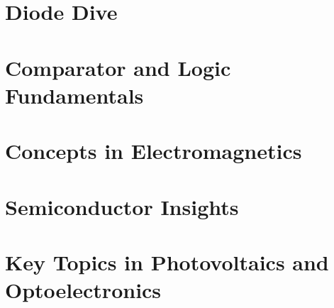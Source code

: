 \documentclass[12pt]{book}
\begin{document}
\section{Diode Dive}











\section{Comparator and Logic Fundamentals}











\section{Concepts in Electromagnetics}












\section{Semiconductor Insights}












\section{Key Topics in Photovoltaics and Optoelectronics}











\end{document}
